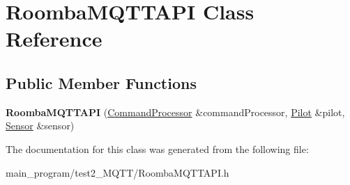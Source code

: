 \hypertarget{class_roomba_m_q_t_t_a_p_i}{}\section{Roomba\+M\+Q\+T\+T\+A\+PI Class Reference}
\label{class_roomba_m_q_t_t_a_p_i}
\subsection*{Public Member Functions}
\begin{DoxyCompactItemize}
\item 
{\bfseries Roomba\+M\+Q\+T\+T\+A\+PI} (\hyperlink{class_command_processor}{Command\+Processor} \&command\+Processor, \hyperlink{class_pilot}{Pilot} \&pilot, \hyperlink{class_sensor}{Sensor} \&sensor)\hypertarget{class_roomba_m_q_t_t_a_p_i_a519947fd8f0f94792006e2d24cb12016}{}\label{class_roomba_m_q_t_t_a_p_i_a519947fd8f0f94792006e2d24cb12016}

\end{DoxyCompactItemize}


The documentation for this class was generated from the following file\+:\begin{DoxyCompactItemize}
\item 
main\+\_\+program/test2\+\_\+\+M\+Q\+T\+T/Roomba\+M\+Q\+T\+T\+A\+P\+I.\+h\end{DoxyCompactItemize}
